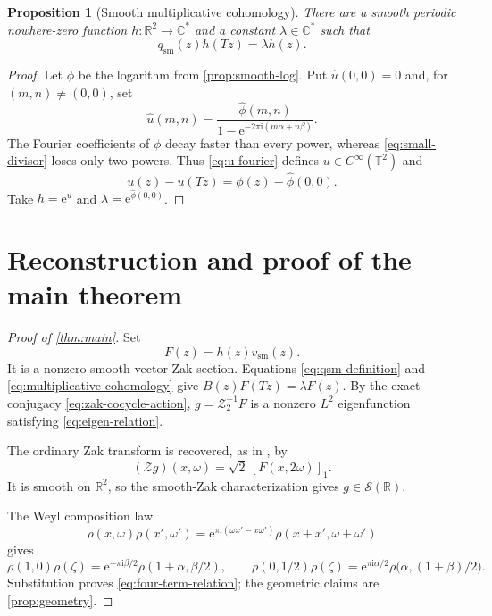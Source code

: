 \documentclass[11pt,reqno]{amsart}
\numberwithin{equation}{section}
\newtheorem{proposition}[theorem]{Proposition}
\theoremstyle{definition}
\newcommand{\R}{\mathbb R}
\newcommand{\C}{\mathbb C}
\newcommand{\T}{\mathbb T}
\newcommand{\cS}{\mathcal S}
\newcommand{\cZ}{\mathcal Z}
\newcommand{\cZtwo}{\mathcal Z_2}
\newcommand{\e}{\mathrm e}
\newcommand{\ii}{\mathrm i}
\begin{document}
\begin{proposition}[Smooth multiplicative cohomology]\label{prop:cohomology}
There are a smooth periodic nowhere-zero function $h:\R^2\to\C^*$ and a
constant $\lambda\in\C^*$ such that
\begin{equation}\label{eq:multiplicative-cohomology}
 q_{\mathrm{sm}}(z)h(Tz)=\lambda h(z).
\end{equation}
\end{proposition}

\begin{proof}
Let $\phi$ be the logarithm from \cref{prop:smooth-log}.  Put
$\widehat u(0,0)=0$ and, for $(m,n)\ne(0,0)$, set
\begin{equation}\label{eq:u-fourier}
 \widehat u(m,n)=
 \frac{\widehat\phi(m,n)}
 {1-\e^{-2\pi\ii(m\alpha+n\beta)}}.
\end{equation}
The Fourier coefficients of $\phi$ decay faster than every power, whereas
\eqref{eq:small-divisor} loses only two powers.  Thus \eqref{eq:u-fourier}
defines $u\in C^\infty(\T^2)$ and
\[
 u(z)-u(Tz)=\phi(z)-\widehat\phi(0,0).
\]
Take $h=\e^u$ and $\lambda=\e^{\widehat\phi(0,0)}$.
\end{proof}

\section{Reconstruction and proof of the main theorem}
\label{sec:completion}

\begin{proof}[Proof of \cref{thm:main}]
Set
\[
 F(z)=h(z)v_{\mathrm{sm}}(z).
\]
It is a nonzero smooth vector-Zak section.  Equations
\eqref{eq:qsm-definition} and \eqref{eq:multiplicative-cohomology} give
$B(z)F(Tz)=\lambda F(z)$.  By the exact conjugacy
\eqref{eq:zak-cocycle-action}, $g=\cZtwo^{-1}F$ is a nonzero $L^2$
eigenfunction satisfying \eqref{eq:eigen-relation}.

The ordinary Zak transform is recovered, as in \cite[\S8]{FPPV2026}, by
\[
 (\cZ g)(x,\omega)=\sqrt2\,[F(x,2\omega)]_1.
\]
It is smooth on $\R^2$, so the smooth-Zak characterization
\cite[Theorem~8.2.5]{Gro01} gives $g\in\cS(\R)$.

The Weyl composition law
\[
 \rho(x,\omega)\rho(x',\omega')
 =\e^{\pi\ii(\omega x'-x\omega')}
  \rho(x+x',\omega+\omega')
\]
gives
\[
 \rho(1,0)\rho(\zeta)
 =\e^{-\pi\ii\beta/2}\rho(1+\alpha,\beta/2),\qquad
 \rho(0,1/2)\rho(\zeta)
 =\e^{\pi\ii\alpha/2}\rho\bigl(\alpha,(1+\beta)/2\bigr).
\]
Substitution proves \eqref{eq:four-term-relation}; the geometric claims are
\cref{prop:geometry}.
\end{proof}
\end{document}
